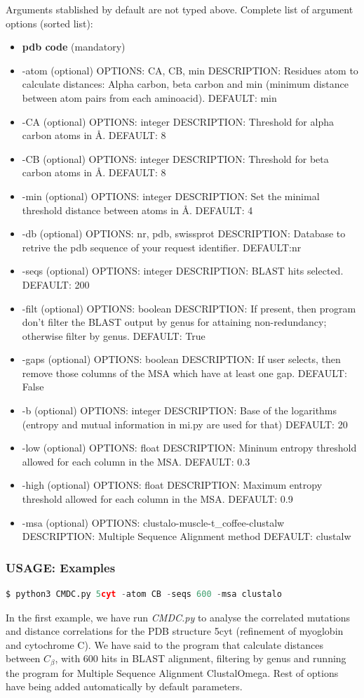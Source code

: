 \documentclass[12pt]{article}
\begin{document}
Arguments stablished by default are not typed above. Complete list of argument options (sorted list):
\begin{itemize}
		\item \textbf{pdb code} (mandatory)
		\item -atom (optional) OPTIONS: CA, CB, min  DESCRIPTION: Residues atom to calculate distances: Alpha carbon, beta carbon and min (minimum distance between atom pairs from each aminoacid). DEFAULT: min
		\item -CA (optional) OPTIONS: integer DESCRIPTION: Threshold for alpha carbon atoms in \r{A}. DEFAULT: 8
		\item -CB (optional) OPTIONS: integer DESCRIPTION: Threshold for beta carbon atoms in \r{A}. DEFAULT: 8
		\item -min (optional) OPTIONS: integer DESCRIPTION: Set the minimal threshold distance between atoms in \r{A}. DEFAULT: 4
		\item -db (optional) OPTIONS: nr, pdb, swissprot DESCRIPTION: Database to retrive the pdb sequence of your request identifier. DEFAULT:nr
		\item -seqs (optional) OPTIONS: integer DESCRIPTION: BLAST hits selected. DEFAULT: 200
		\item -filt (optional) OPTIONS: boolean DESCRIPTION: If present, then program don't filter the BLAST output by genus for attaining non-redundancy; otherwise filter by genus. DEFAULT: True
		\item -gaps (optional) OPTIONS: boolean DESCRIPTION: If user selects, then remove those columns of the MSA which have at least one gap. DEFAULT: False
		\item -b (optional) OPTIONS: integer DESCRIPTION: Base of the logarithms (entropy and mutual information in mi.py are used for that) DEFAULT: 20
		\item -low (optional) OPTIONS: float DESCRIPTION: Mininum entropy threshold allowed for each column in the MSA. DEFAULT: 0.3 
		\item -high (optional) OPTIONS: float DESCRIPTION: Maximum entropy threshold allowed for each column in the MSA. DEFAULT: 0.9
		\item -msa (optional) OPTIONS: clustalo-muscle-t\_coffee-clustalw DESCRIPTION: Multiple Sequence Alignment method DEFAULT: clustalw
\end{itemize}

\subsubsection{USAGE: Examples}
\begin{lstlisting}[language=python]
$ python3 CMDC.py 5cyt -atom CB -seqs 600 -msa clustalo
\end{lstlisting}
In the first example, we have run \textit{CMDC.py} to analyse the correlated mutations and distance correlations for the PDB structure 5cyt (refinement of myoglobin and cytochrome C). We have said to the program that calculate distances between $C_{\beta}$, with 600 hits in BLAST alignment, filtering by genus and running the program for Multiple Sequence Alignment ClustalOmega. Rest of options have being added automatically by default parameters.\\
\end{document}
